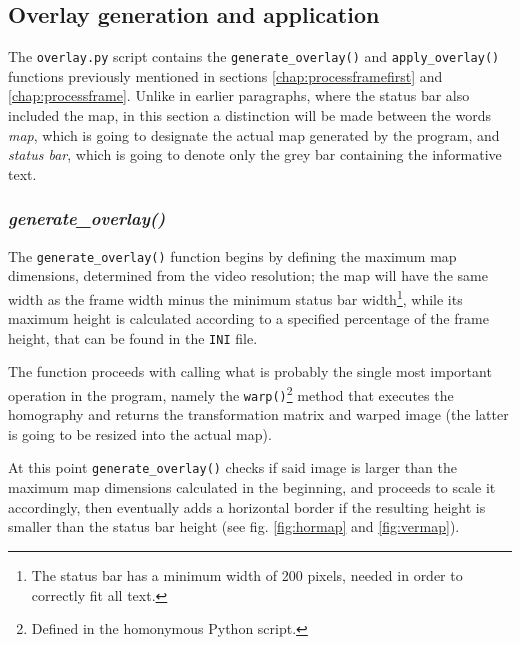 \documentclass[12pt]{article}
\begin{document}

\subsection{Overlay generation and application}
\label{chap:overlay}
The \lstinline{overlay.py} script contains the \lstinline{generate_overlay()} and \lstinline{apply_overlay()} functions previously mentioned in sections \ref{chap:processframefirst} and \ref{chap:processframe}. Unlike in earlier paragraphs, where the status bar also included the map, in this section a distinction will be made between the words \textit{map}, which is going to designate the actual map generated by the program, and \textit{status bar}, which is going to denote only the grey bar containing the informative text.

\subsubsection{\textit{generate\_overlay()}}
\label{chap:genoverlay}
The \lstinline{generate_overlay()} function begins by defining the maximum map dimensions, determined from the video resolution; the map will have the same width as the frame width minus the minimum status bar width\footnote{The status bar has a minimum width of 200 pixels, needed in order to correctly fit all text.}, while its maximum height is calculated according to a specified percentage of the frame height, that can be found in the \lstinline{INI} file.

The function proceeds with calling what is probably the single most important operation in the program, namely the \lstinline{warp()}\footnote{Defined in the homonymous Python script.} method that executes the homography and returns the transformation matrix and warped image (the latter is going to be resized into the actual map).

At this point \lstinline{generate_overlay()} checks if said image is larger than the maximum map dimensions calculated in the beginning, and proceeds to scale it accordingly, then eventually adds a horizontal border if the resulting height is smaller than the status bar height (see fig. \ref{fig:hormap} and \ref{fig:vermap}).
\end{document}
